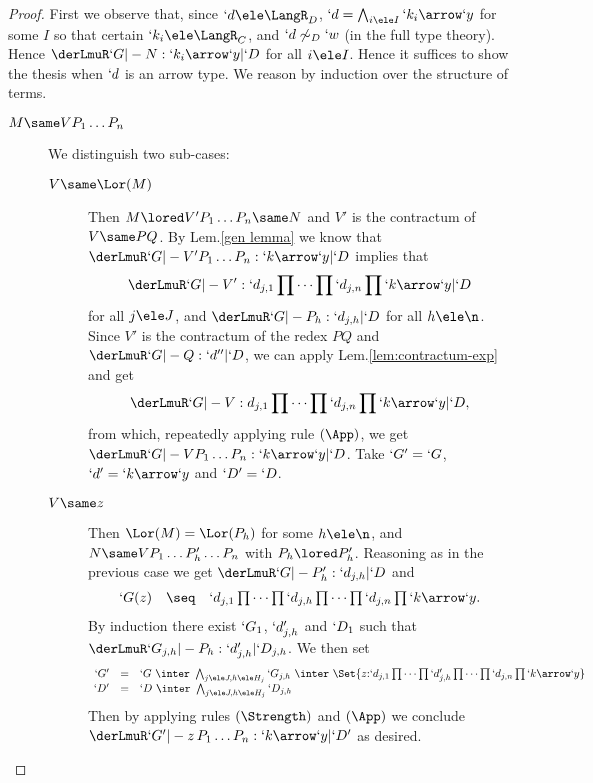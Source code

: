\documentclass{lmcs}
\begin{document}
 \begin{proof}
First we observe that, since $`d \ele \LangR_D$, $`d = \bigwedge_{i\ele I} `k_i\arrow`y$ for some $I$ so that certain $`k_i \ele \LangR_C$, and $`d \not\sim_D`w$ (in the full type theory).
Hence $\derLmuR `G |- N : `k_i\arrow`y | `D $ for all $i\ele I$. 
Hence it suffices to show the thesis when $`d$ is an arrow type.
We reason by induction over the structure of terms.

 \begin{description}

\item [$ M \same VP_1\dots P_n $] 
	We distinguish two sub-cases:	

 	\begin {description}

 	\item [$V \same \Lor(M)$] Then $M \lored V'P_1\dots P_n \same N$ and $V'$ is the contractum of $V \same PQ$.
By Lem.\skp\ref{gen lemma} we know that $\derLmuR `G |- V'P_1\dots P_n : `k\arrow`y | `D $ implies that 
 \[ \derLmuR `G |- V' : `d_{j,1}\prod \cdots\prod `d_{j,n}\prod `k\arrow`y | `D \] 
for all $j\ele J$, and $\derLmuR `G |- P_h: `d_{j,h} | `D $ for all $h \ele \n$. 
Since $V'$ is the contractum of the redex $PQ$ and $\derLmuR `G |- Q : `d'' | `D $, we can apply Lem.\skp\ref{lem:contractum-exp} and get 
 \[ \derLmuR `G |- V : d_{j,1}\prod \cdots\prod `d_{j,n}\prod `k\arrow`y | `D , \]
from which, repeatedly applying rule $(\App)$, we get $\derLmuR `G |- VP_1\dots P_n : `k\arrow`y | `D $. Take $`G' = `G$, $`d'= `k\arrow`y$ and $`D' = `D $.
 
 \item [$V \same z$] Then $\Lor(M) = \Lor(P_h) $ for some $h \ele \n$, and $N \same VP_1\dots P'_h \dots P_n$ with $P_h \lored P'_h$. 
Reasoning as in the previous case we get $\derLmuR `G |- P'_h: `d_{j,h} | `D $ and 
 \[ \begin{array}{rcl}
`G(z) &\seq& `d_{j,1}\prod \dots\prod `d_{j,h}\prod \dots\prod `d_{j,n}\prod `k\arrow`y.
 \end{array} \] 
By induction there exist $`G_1$, $`d'_{j,h}$ and $`D_1$ such that $\derLmuR `G_{j,h} |- P_h: `d'_{j,h} | `D_{j,h} $. 
We then set 
 \[ \begin{array}{rcl}
`G' &=&`G \ \inter \ \bigwedge_{j\ele J, h\ele H_j}`G_{j,h} \ \inter \ 
	\Set{ z{:}`d_{j,1}\prod \dots\prod `d'_{j,h}\prod \dots\prod `d_{j,n}\prod `k\arrow `y} \\
`D' &=& `D \ \inter \ \bigwedge_{j\ele J, h\ele H_j}`D_{j,h} 
 \end{array} \]
Then by applying rules $(\Strength)$ and $(\App)$ we conclude $\derLmuR `G' |- z\,P_1\dots P_n : `k\arrow`y | `D' $ as desired.	 
 \end{description}
	

\end{description}
\end{proof}
\end{document}
